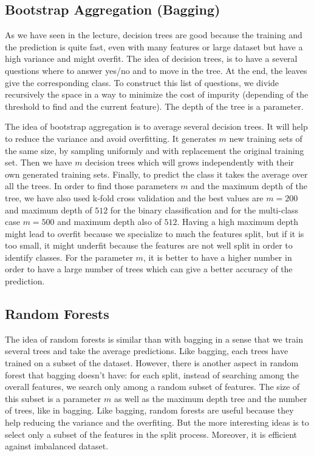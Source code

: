 \documentclass{article} %
\begin{document}
\subsection{Bootstrap Aggregation (Bagging)}

As we have seen in the lecture, decision trees are good because the training and the prediction is quite fast, even with many features or large dataset but have a high variance and might overfit. The idea of decision trees, is to have a several questions where to answer yes/no and to move in the tree. At the end, the leaves give the corresponding class. To construct this list of questions, we divide recursively the space in a way to minimize the cost of impurity (depending of the threshold to find and the current feature). The depth of the tree is a parameter.

The idea of bootstrap aggregation is to average several decision trees. It will help to reduce the variance and avoid overfitting. It generates $m$ new training sets of the same size, by sampling uniformly and with replacement the original training set. Then we have $m$ decision trees which will grows independently with their own generated training sets. Finally, to predict the class it takes the average over all the trees. In order to find those parameters $m$ and the maximum depth of the tree, we have also used k-fold cross validation and the best values are $m = 200$ and maximum depth of $512$ for the binary classification and for the multi-class case $m = 500$ and maximum depth also of $512$. Having a high maximum depth might lead to overfit because we specialize to much the features split, but if it is too small, it might underfit because the features are not well split in order to identify classes. For the parameter $m$, it is better to have a higher number in order to have a large number of trees which can give a better accuracy of the prediction.

\subsection{Random Forests}

The idea of random forests is similar than with bagging in a sense that we train several trees and take the average predictions. Like bagging, each trees have trained on a subset of the dataset. However, there is another aspect in random forest that bagging doesn't have: for each split, instead of searching among the overall features, we search only among a random subset of features. The size of this subset is a parameter $m$ as well as the maximum depth tree and the number of trees, like in bagging. Like bagging, random forests are useful because they help reducing the variance and the overfiting. But the more interesting ideas is to select only a subset of the features in the split process. Moreover, it is efficient against imbalanced dataset.
\end{document}
